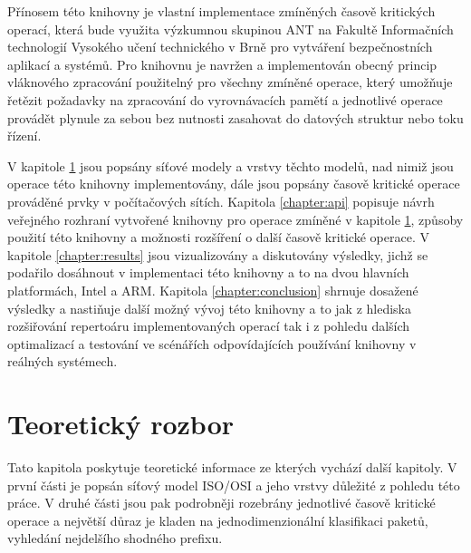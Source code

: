 Přínosem této knihovny je vlastní implementace zmíněných časově kritických operací, která bude
využita výzkumnou skupinou ANT na Fakultě Informačních technologií Vysokého učení technického v Brně
pro vytváření bezpečnostních aplikací a systémů.
Pro knihovnu je navržen a implementován obecný princip vláknového zpracování použitelný pro všechny
zmíněné operace, který umožňuje řetězit požadavky na zpracování do vyrovnávacích pamětí a jednotlivé operace
provádět plynule za sebou bez nutnosti zasahovat do datových struktur nebo toku řízení.

V kapitole \ref{chapter:theoretical} jsou popsány síťové modely a vrstvy těchto modelů,
nad nimiž jsou operace této knihovny implementovány, dále jsou popsány časově kritické operace prováděné
prvky v počítačových sítích. Kapitola \ref{chapter:api} popisuje návrh veřejného rozhraní vytvořené knihovny
pro operace zmíněné v kapitole \ref{chapter:theoretical}, způsoby použití této knihovny a možnosti rozšíření
o další časově kritické operace. V kapitole \ref{chapter:results} jsou vizualizovány a diskutovány
výsledky, jichž se podařilo dosáhnout v implementaci této knihovny a to na dvou hlavních platformách, Intel a ARM.
Kapitola \ref{chapter:conclusion} shrnuje dosažené výsledky a nastiňuje další možný vývoj této knihovny
a to jak z hlediska rozšiřování repertoáru implementovaných operací tak i z pohledu dalších optimalizací
a testování ve scénářích odpovídajících používání knihovny v reálných systémech.

\chapter{Teoretický rozbor}\label{chapter:theoretical} %

Tato kapitola poskytuje teoretické informace ze kterých vychází další kapitoly.
V první části je popsán síťový model ISO/OSI a jeho vrstvy důležité z pohledu této práce.
V druhé části jsou pak podrobněji rozebrány jednotlivé časově kritické operace a největší důraz je
kladen na jednodimenzionální klasifikaci paketů, vyhledání nejdelšího shodného prefixu.


